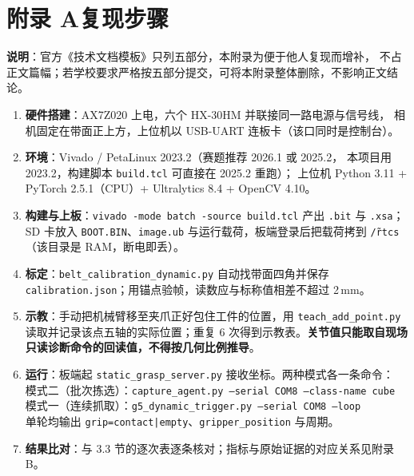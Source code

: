 \documentclass[UTF8,a4paper,zihao=5,fontset=windows]{ctexart}
\newcommand{\code}[1]{\texttt{\small #1}}
\begin{document}
\section*{附录 A\quad 复现步骤}
{\small
\noindent\textbf{说明}：官方《技术文档模板》只列五部分，本附录为便于他人复现而增补，
不占正文篇幅；若学校要求严格按五部分提交，可将本附录整体删除，不影响正文结论。

\begin{enumerate}[label=\arabic*.,leftmargin=1.8em]
  \item \textbf{硬件搭建}：AX7Z020 上电，六个 HX-30HM 并联接同一路电源与信号线，
        相机固定在带面正上方，上位机以 USB-UART 连板卡（该口同时是控制台）。
  \item \textbf{环境}：Vivado / PetaLinux 2023.2（赛题推荐 2026.1 或 2025.2，
        本项目用 2023.2，构建脚本 \code{build.tcl} 可直接在 2025.2 重跑）；
        上位机 Python 3.11 + PyTorch 2.5.1（CPU）+ Ultralytics 8.4 + OpenCV 4.10。
  \item \textbf{构建与上板}：\code{vivado -mode batch -source build.tcl} 产出
        \code{.bit} 与 \code{.xsa}；SD 卡放入 \code{BOOT.BIN}、\code{image.ub}
        与运行载荷，板端登录后把载荷拷到 \code{\~/rtcs}（该目录是 RAM，断电即丢）。
  \item \textbf{标定}：\code{belt\_calibration\_dynamic.py} 自动找带面四角并保存
        \code{calibration.json}；用锚点验帧，读数应与标称值相差不超过 2\,mm。
  \item \textbf{示教}：手动把机械臂移至夹爪正好包住工件的位置，用 \code{teach\_add\_point.py}
        读取并记录该点五轴的实际位置；重复 6 次得到示教表。\textbf{关节值只能取自现场
        只读诊断命令的回读值，不得按几何比例推导}。
  \item \textbf{运行}：板端起 \code{static\_grasp\_server.py} 接收坐标。两种模式各一条命令：\\
        \quad 模式二（批次拣选）：\code{capture\_agent.py --serial COM8 --class-name cube}\\
        \quad 模式一（连续抓取）：\code{g5\_dynamic\_trigger.py --serial COM8 --loop}\\
        单轮均输出 \code{grip=contact|empty}、\code{gripper\_position} 与周期。
  \item \textbf{结果比对}：与 3.3 节的逐次表逐条核对；指标与原始证据的对应关系见附录 B。
\end{enumerate}
}
\end{document}
